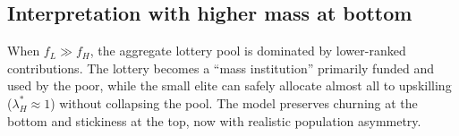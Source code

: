 \documentclass[11pt]{article}
\begin{document}
\subsection{Interpretation with higher mass at bottom}
When $f_L \gg f_H$, the aggregate lottery pool is dominated by lower-ranked contributions. The lottery becomes a ``mass institution'' primarily funded and used by the poor, while the small elite can safely allocate almost all to upskilling ($\lambda_H^* \approx 1$) without collapsing the pool. The model preserves churning at the bottom and stickiness at the top, now with realistic population asymmetry.
\end{document}
